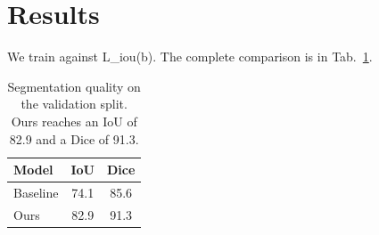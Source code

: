 \documentclass{article}
\newcommand{\iouloss}[1]{{\cal L}_{\rm iou}(#1)}
\newcommand{\segmentationtable}{
\begin{table}
\begin{tabular}{lcc}
Model & IoU & Dice \\
\hline
Baseline & 74.1 & 85.6 \\
Ours & 82.9 & 91.3 \\
\end{tabular}
\caption{Segmentation quality on the validation split. Ours reaches an IoU of
82.9 and a Dice of 91.3.}
\label{tab:segmentation}
\end{table}
}
\begin{document}
\section{Results}

We train against \iouloss{b}. The complete comparison is in
Tab.~\ref{tab:segmentation}.

\segmentationtable
\end{document}
